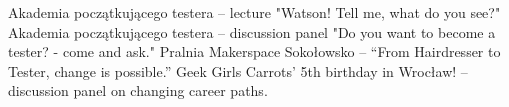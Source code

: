\begin{scholarship}
					{Akademia początkującego testera – lecture "Watson! Tell me, what do you see?"}
					{Akademia początkującego testera – discussion panel "Do you want to become a tester? - come and ask."}
					{Pralnia Makerspace Sokołowsko – “From Hairdresser to Tester, change is possible.”}
					{Geek Girls Carrots' 5th birthday in Wrocław! – discussion panel on changing career paths.}

\end{scholarship}